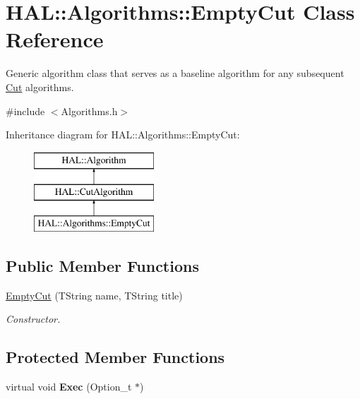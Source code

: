 \hypertarget{class_h_a_l_1_1_algorithms_1_1_empty_cut}{\section{H\-A\-L\-:\-:Algorithms\-:\-:Empty\-Cut Class Reference}
\label{class_h_a_l_1_1_algorithms_1_1_empty_cut}
}


Generic algorithm class that serves as a baseline algorithm for any subsequent \hyperlink{class_h_a_l_1_1_algorithms_1_1_cut}{Cut} algorithms.  




{\ttfamily \#include $<$Algorithms.\-h$>$}

Inheritance diagram for H\-A\-L\-:\-:Algorithms\-:\-:Empty\-Cut\-:\begin{figure}[H]
\begin{center}
\leavevmode
\includegraphics[height=3.000000cm]{class_h_a_l_1_1_algorithms_1_1_empty_cut}
\end{center}
\end{figure}
\subsection*{Public Member Functions}
\begin{DoxyCompactItemize}
\item 
\hyperlink{class_h_a_l_1_1_algorithms_1_1_empty_cut_a07eb3faf7e5ee7f913065cb01622cd8f}{Empty\-Cut} (T\-String name, T\-String title)
\begin{DoxyCompactList}\small\item\em Constructor. \end{DoxyCompactList}\end{DoxyCompactItemize}
\subsection*{Protected Member Functions}
\begin{DoxyCompactItemize}
\item 
\hypertarget{class_h_a_l_1_1_algorithms_1_1_empty_cut_a39235392c1b3a0f8253114dbcdf0a8a6}{virtual void {\bfseries Exec} (Option\-\_\-t $\ast$)}\label{class_h_a_l_1_1_algorithms_1_1_empty_cut_a39235392c1b3a0f8253114dbcdf0a8a6}

\end{DoxyCompactItemize}
